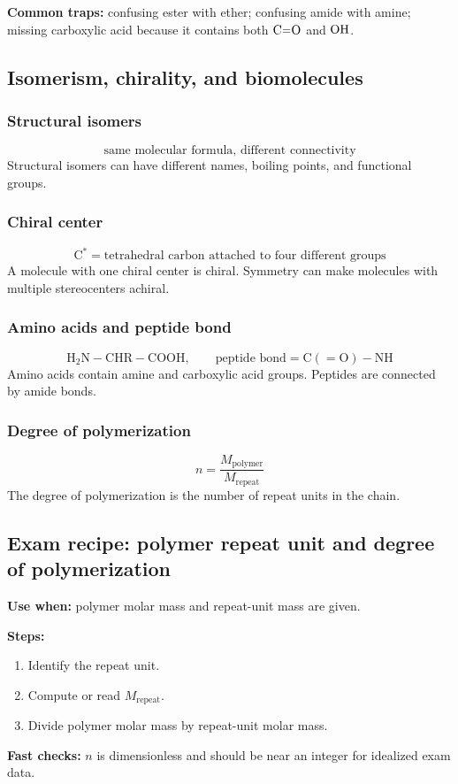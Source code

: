 \textbf{Common traps:} confusing ester with ether; confusing amide with amine; missing carboxylic acid because it contains both \(\ce{C=O}\) and \(\ce{OH}\).

\subsection{Isomerism, chirality, and biomolecules}

\subsubsection{Structural isomers}
\[
\text{same molecular formula, different connectivity}
\]
Structural isomers can have different names, boiling points, and functional groups.

\subsubsection{Chiral center}
\[
\mathrm{C^*}=\text{tetrahedral carbon attached to four different groups}
\]
A molecule with one chiral center is chiral. Symmetry can make molecules with multiple stereocenters achiral.

\subsubsection{Amino acids and peptide bond}
\[
\mathrm{H_2N{-}CHR{-}COOH}, \qquad
\text{peptide bond}=\mathrm{C(=O){-}NH}
\]
Amino acids contain amine and carboxylic acid groups. Peptides are connected by amide bonds.

\subsubsection{Degree of polymerization}
\[
n=\frac{M_{\mathrm{polymer}}}{M_{\mathrm{repeat}}}
\]
The degree of polymerization is the number of repeat units in the chain.

\subsection{Exam recipe: polymer repeat unit and degree of polymerization}
\textbf{Use when:} polymer molar mass and repeat-unit mass are given.

\textbf{Steps:}
\begin{enumerate}
    \item Identify the repeat unit.
    \item Compute or read \(M_{\mathrm{repeat}}\).
    \item Divide polymer molar mass by repeat-unit molar mass.
\end{enumerate}

\textbf{Fast checks:} \(n\) is dimensionless and should be near an integer for idealized exam data.
